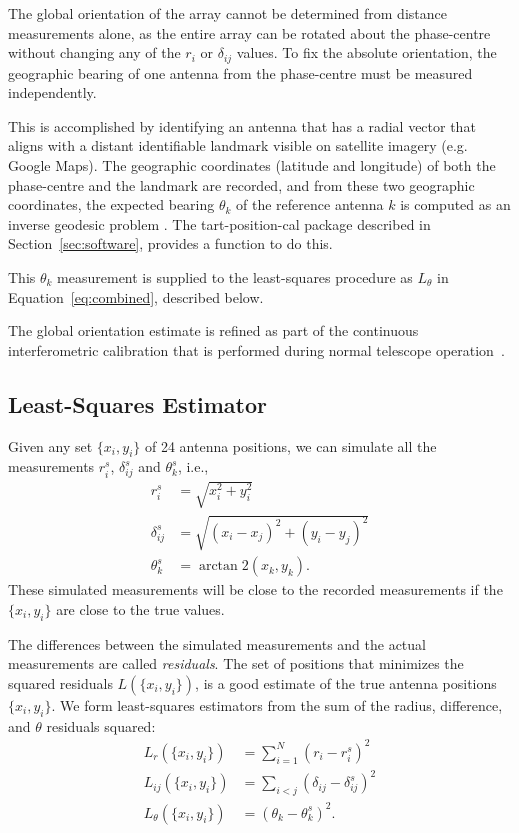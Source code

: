 \documentclass[twocolumn, a4paper,10pt]{article}
\begin{document}
The global orientation of the array cannot be determined from distance measurements alone, as the entire array can be rotated about the phase-centre without changing any of the $r_i$ or $\delta_{ij}$ values. To fix the absolute orientation, the geographic bearing of one antenna from the phase-centre must be measured independently.

This is accomplished by identifying an antenna that has a radial vector that aligns with a distant identifiable landmark visible on satellite imagery (e.g. Google Maps). The geographic coordinates (latitude and longitude) of both the phase-centre and the landmark are recorded, and from these two geographic coordinates, the expected bearing $\theta_k$ of the reference antenna $k$ is computed as an inverse geodesic problem . The tart-position-cal package described in Section~\ref{sec:software}, provides a function to do this.

This $\theta_k$ measurement is supplied to the least-squares procedure as $L_\theta$ in Equation~\ref{eq:combined}, described below.

The global orientation estimate is refined as part of the continuous interferometric calibration that is performed during normal telescope operation~\cite{moltenocalibratoion}.


\subsection{Least-Squares Estimator}

Given any set $\{x_i, y_i\}$ of 24 antenna positions, we can simulate all the measurements $r_i^s$, $\delta_{ij}^s$ and $\theta_k^s$, i.e.,
\begin{align*}
	r^s_i         & =  \sqrt{x_i^2 + y_i^2}                \\
	\delta^s_{ij} & = \sqrt{(x_i - x_j)^2 + (y_i - y_j)^2} \\
	\theta^s_k    & = \arctan2\!\left(x_k, y_k\right).
\end{align*}
These simulated measurements will be close to the recorded measurements if the $\{x_i, y_i\}$ are close to the true values.

The differences between the simulated measurements and the actual measurements are called {\em residuals}. The set of positions that minimizes the squared residuals $L(\{x_i, y_i\})$, is a good estimate of the true antenna positions $\{x_i, y_i\}$. We form least-squares estimators from the sum of the radius, difference, and $\theta$ residuals squared:
\begin{align*}
	L_r(\{x_i, y_i\})      & = \sum_{i=1}^{N} \left( r_i - r^s_i \right)^2              \\
	L_{ij}(\{x_i, y_i\})   & = \sum_{i<j} \left( \delta_{ij} -  \delta^s_{ij} \right)^2 \\
	L_\theta(\{x_i, y_i\}) & = \left( \theta_k - \theta^s_k \right)^2.
\end{align*}
\end{document}

